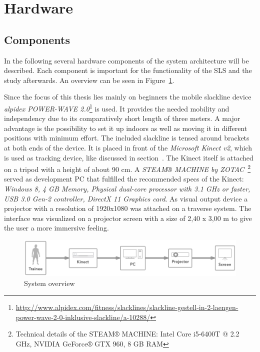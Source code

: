 \section{Hardware}\label{5_1_systemSetup}
\subsection{Components}\label{5_1_hardwareComponents}
In the following several hardware components of the system architecture will be described. Each component is important for the functionality of the SLS and the study afterwards. An overview can be seen in Figure~\ref{fig:5_3_systemArchitecture}.

Since the focus of this thesis lies mainly on beginners the mobile slackline device \textit{alpidex POWER-WAVE 2.0}\footnote{\url{http://www.alpidex.com/fitness/slacklines/slackline-gestell-in-2-laengen-power-wave-2-0-inklusive-slackline/a-10288/}} is used.
It provides the needed mobility and independency due to its comparatively short length of three meters.
A major advantage is the possibility to set it up indoors as well as moving it in different positions with minimum effort.
The included slackline is tensed around brackets at both ends of the device.
It is placed in front of the \textit{Microsoft Kinect v2}, which is used as tracking device, like discussed in section~\textit{}. The Kinect itself is attached on a tripod with a height of about 90 cm.
A \textit{STEAM® MACHINE by ZOTAC}~\footnote{Technical details of the STEAM® MACHINE: Intel Core i5-6400T @ 2.2 GHz, NVIDIA GeForce® GTX 960, 8 GB RAM} served as development PC that fulfilled the recommended specs of the Kinect: \textit{Windows 8, 4 GB Memory, Physical dual-core processor with 3.1 GHz or faster, USB 3.0 Gen-2 controller, DirectX 11 Graphics card}. As visual output device a projector with a resolution of 1920x1080 was attached on a traverse system.
The interface was visualized on a projector screen with a size of 2,40 x 3,00 m to give the user a more immersive feeling.

\begin{figure}[htb]
	\centering
	\begin{minipage}[t]{1\linewidth}
		\centering
		\includegraphics[width=1\linewidth]{Pictures/5_3_systemArchitecture}
		\caption{System overview}
		\label{fig:5_3_systemArchitecture}
	\end{minipage}
\end{figure}

